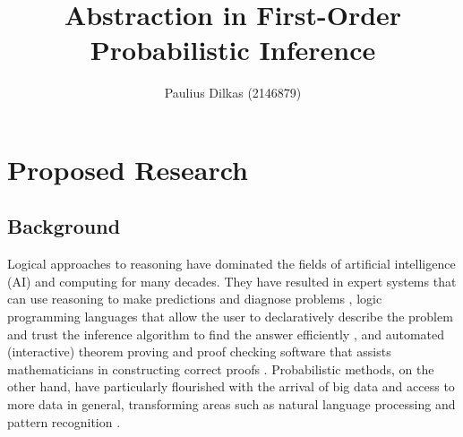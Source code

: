 \documentclass[11pt,english,twocolumn]{article}
\begin{document}
\title{Abstraction in First-Order Probabilistic Inference}

\author{Paulius Dilkas (2146879)}
\date{}
\maketitle

\section{Proposed Research}

\subsection*{Background} %



Logical approaches to reasoning have dominated the fields of artificial
intelligence (AI) and computing for many decades. They have resulted in expert
systems that can use reasoning to make predictions and diagnose problems
\cite{hayes1983building}, logic programming languages that allow the user to
declaratively describe the problem and trust the inference algorithm to find the
answer efficiently \cite{DBLP:books/sp/Lloyd87}, and automated (interactive)
theorem proving and proof checking software that assists mathematicians in
constructing correct proofs \cite{DBLP:books/el/RobinsonV01}. Probabilistic
methods, on the other hand, have particularly flourished with the arrival of big
data and access to more data in general, transforming areas such as natural
language processing and pattern recognition \cite{DBLP:series/sci/BrazAR08}.
\end{document}
